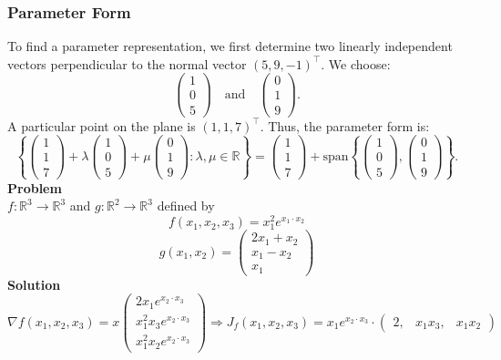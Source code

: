 \documentclass{article}
\begin{document}
\subsubsection*{Parameter Form}
To find a parameter representation, we first determine two linearly independent vectors perpendicular to the normal vector \( (5,9,-1)^{\top} \). We choose:
\[
\begin{pmatrix} 1 \\ 0 \\ 5 \end{pmatrix} \quad \text{and} \quad \begin{pmatrix} 0 \\ 1 \\ 9 \end{pmatrix}.
\]
A particular point on the plane is \( (1,1,7)^{\top} \). Thus, the parameter form is:
\[
\left\{ \begin{pmatrix} 1 \\ 1 \\ 7 \end{pmatrix} + \lambda \begin{pmatrix} 1 \\ 0 \\ 5 \end{pmatrix} + \mu \begin{pmatrix} 0 \\ 1 \\ 9 \end{pmatrix} : \lambda, \mu \in \mathbb{R} \right\} = \begin{pmatrix} 1 \\ 1 \\ 7 \end{pmatrix} + \text{span} \left\{ \begin{pmatrix} 1 \\ 0 \\ 5 \end{pmatrix}, \begin{pmatrix} 0 \\ 1 \\ 9 \end{pmatrix} \right\}.
\]
\newpage
\textbf{Problem}\\
$ f : \mathbb{R}^{3} \rightarrow \mathbb{R}^3$ and $g : \mathbb{R}^2 \rightarrow \mathbb{R}^3$ defined by
\[
f(x_1, x_2, x_3) = x_1^2 e^{x_1 \cdot x_2}
\]
\[
g(x_1, x_2) = \begin{pmatrix} 2x_1 + x_2 \\ x_1 - x_2 \\ x_1 \end{pmatrix}
\]
\textbf{Solution}
\[
\nabla f(x_1, x_2, x_3) = x
\begin{pmatrix}
2x_1 e^{x_2 \cdot x_3} \\
x_1^2 x_3 e^{x_2 \cdot x_3} \\
x_1^2 x_2 e^{x_2 \cdot x_3}
\end{pmatrix}
\Rightarrow J_f(x_1, x_2, x_3) = x_1 e^{x_2 \cdot x_3} \cdot \begin{pmatrix} 2, & x_1 x_3, & x_1 x_2 \end{pmatrix}
\]
\end{document}

